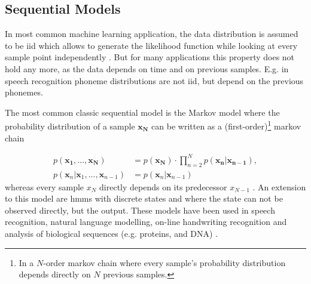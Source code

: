 \subsection{Sequential Models}

In most common machine learning application, the data distribution is assumed to be \gls{iid} which allows to generate the likelihood function while looking at every sample point independently \cite{Bishop:2006:PRM:1162264}. But for many applications this property does not hold any more, as the data depends on time and on previous samples. E.g. in speech recognition \gls{phoneme} distributions are not \gls{iid}, but depend on the previous \glspl{phoneme}.

The most common classic sequential model is the Markov model \cite{markov1910research} where the probability distribution of a sample $\mathbf{x_N}$ can be written as a (first-order)\footnote{In a $N$-order markov chain where every sample's probability distribution depends directly on $N$ previous samples.} markov chain

\begin{align*} p(\mathbf{x_1}, ..., \mathbf{x_N}) &= p(\mathbf{x_N})\cdot \prod^N_{n=2} p(\mathbf{x_n}|\mathbf{x_{n-1}}), \\
p(\mathbf{x}_n|\mathbf{x}_1, ..., \mathbf{x}_{n-1})&=p(\mathbf{x}_n|\mathbf{x}_{n-1})
\end{align*}
whereas every sample $x_N$ directly depends on its predecessor  $x_{N-1}$  \cite{Bishop:2006:PRM:1162264}. An extension to this model are \glspl{hmm} with discrete states and where the state can not be observed directly, but the output. These models have been used in speech recognition, natural language modelling, on-line handwriting recognition and analysis of biological sequences (e.g. proteins, and DNA) \cite{Bishop:2006:PRM:1162264}.

